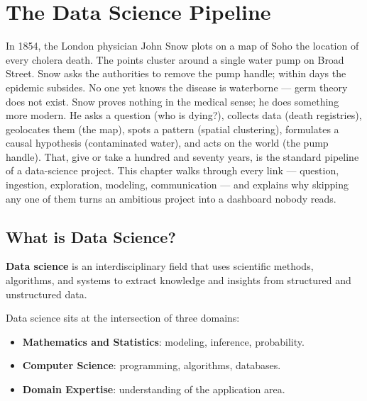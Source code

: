 \chapter{The Data Science Pipeline}
\label{ch:pipeline}

In 1854, the London physician John Snow plots on a map of Soho the location of every cholera death. The points cluster around a single water pump on Broad Street. Snow asks the authorities to remove the pump handle; within days the epidemic subsides. No one yet knows the disease is waterborne --- germ theory does not exist. Snow proves nothing in the medical sense; he does something more modern. He asks a question (who is dying?), collects data (death registries), geolocates them (the map), spots a pattern (spatial clustering), formulates a causal hypothesis (contaminated water), and acts on the world (the pump handle). That, give or take a hundred and seventy years, is the standard pipeline of a data-science project. This chapter walks through every link --- question, ingestion, exploration, modeling, communication --- and explains why skipping any one of them turns an ambitious project into a dashboard nobody reads.

\section{What is Data Science?}

\begin{definition}
\textbf{Data science} is an interdisciplinary field that uses scientific methods, algorithms, and systems to extract knowledge and insights from structured and unstructured data.
\end{definition}

\begin{intuition}
Data science sits at the intersection of three domains:
\begin{itemize}
\item \textbf{Mathematics and Statistics}: modeling, inference, probability.
\item \textbf{Computer Science}: programming, algorithms, databases.
\item \textbf{Domain Expertise}: understanding of the application area.
\end{itemize}
\end{intuition}


